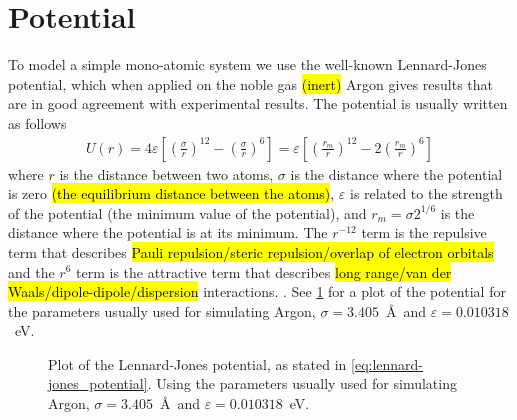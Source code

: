 \section{Potential}
To model a simple mono-atomic system we use the well-known Lennard-Jones potential\cite{jones1924potential}, which when applied on the noble gas \hl{(inert)} Argon gives results that are in good agreement with experimental results. The potential is usually written as follows
\begin{align}
    U(r) = 4\varepsilon\left[ \left(\frac{\sigma}{r}\right)^{12} - \left(\frac{\sigma}{r}\right)^{6} \right]
    = \varepsilon\left[ \left(\frac{r_m}{r}\right)^{12} - 2\left(\frac{r_m}{r}\right)^{6} \right]
    \label{eq:lennard-jones_potential}
\end{align}
where $r$ is the distance between two atoms, $\sigma$ is the distance where the potential is zero \hl{(the equilibrium distance between the atoms)}, $\varepsilon$ is related to the strength of the potential (the minimum value of the potential), and $r_m = \sigma 2^{1/6}$ is the distance where the potential is at its minimum. The $r^{-12}$ term is the repulsive term that describes \hl{Pauli repulsion/steric repulsion/overlap of electron orbitals} and the $r^{6}$ term is the attractive term that describes \hl{long range/van der Waals/dipole-dipole/dispersion} interactions. . See \cref{fig:lennard-jones_potential} for a plot of the potential for the parameters usually used for simulating Argon\cite{frenkel2001understanding}, $\sigma = 3.405$~\AA\ and $\varepsilon = 0.010318$~eV.

\begin{figure}
    \centering
    
%     
    \caption{
        Plot of the Lennard-Jones potential, as stated in \cref{eq:lennard-jones_potential}. Using the parameters usually used for simulating Argon\cite{frenkel2001understanding}, $\sigma = 3.405$~\AA\ and $\varepsilon = 0.010318$~eV.
        \label{fig:lennard-jones_potential}
    }
\end{figure}

